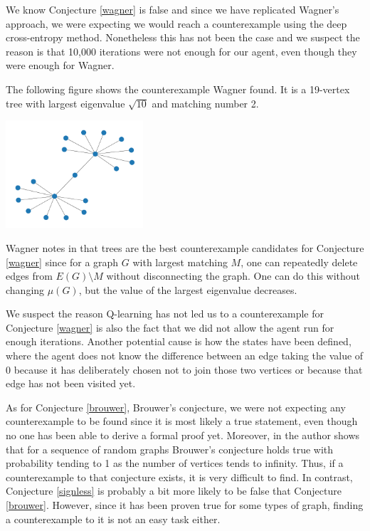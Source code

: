 \documentclass[11pt]{article}
\theoremstyle{definition}
\begin{document}
We know Conjecture \ref{wagner} is false and since we have replicated Wagner's approach, we were expecting we would reach a counterexample using the deep cross-entropy method. Nonetheless this has not been the case and we suspect the reason is that 10,000 iterations were not enough for our agent, even though they were enough for Wagner. 

The following figure shows the counterexample Wagner found. It is a 19-vertex tree with largest eigenvalue $\sqrt{10}$ and matching number 2.

\begin{center}
    \centering
    \includegraphics[width=\textwidth, height=4cm, keepaspectratio=true]{images/counterexample_wagner.png}
    \label{fig:wagner_counterexample}
\end{center}

Wagner notes in \cite{Wagner:2021} that trees are the best counterexample candidates for Conjecture \ref{wagner} since for a graph $G$ with largest matching $M$, one can repeatedly delete edges from $E(G)\setminus M$ without disconnecting the graph. One can do this without changing $\mu(G)$, but the value of the largest eigenvalue decreases.

We suspect the reason Q-learning has not led us to a counterexample for Conjecture \ref{wagner} is also the fact that we did not allow the agent run for enough iterations. Another potential cause is how the states have been defined, where the agent does not know the difference between an edge taking the value of 0 because it has deliberately chosen not to join those two vertices or because that edge has not been visited yet. 

As for Conjecture \ref{brouwer}, Brouwer's conjecture, we were not expecting any counterexample to be found since it is most likely a true statement, even though no one has been able to derive a formal proof yet. Moreover, in \cite{Rocha:2019} the author shows that for a sequence of random graphs Brouwer’s conjecture holds true with probability tending to 1 as the number of vertices tends to infinity. Thus, if a counterexample to that conjecture exists, it is very difficult to find. In contrast, Conjecture \ref{signless} is probably a bit more likely to be false that Conjecture \ref{brouwer}. However, since it has been proven true for some types of graph, finding a counterexample to it is not an easy task either.
\end{document}
